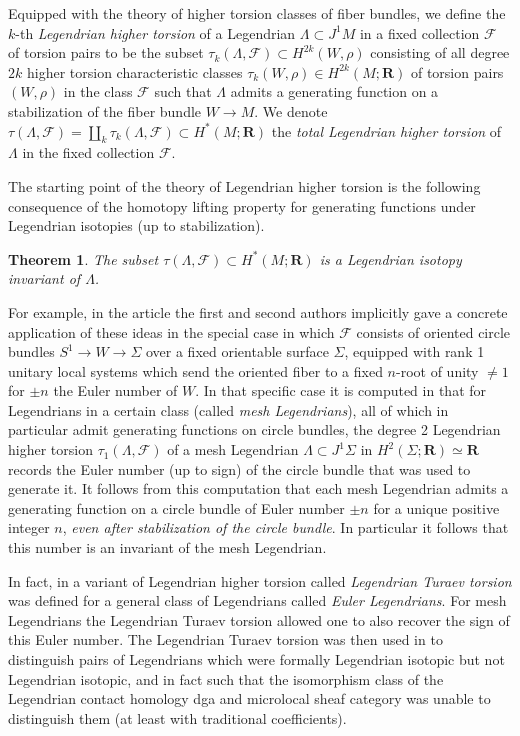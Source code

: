 \documentclass{amsart}
\newcommand\cF{\mathcal{F}}
\def\bR{\mathbf{R}}
\newtheorem{theorem}{Theorem}[section]
\theoremstyle{definition}
\theoremstyle{remark}
\newtheorem{inductive lemma}[theorem]{Inductive Lemma}
\begin{document}
Equipped with the theory of higher torsion classes of fiber bundles, we define the $k$-th {\em Legendrian higher torsion} of a Legendrian $\Lambda \subset J^1M$ in a fixed collection $\cF$ of torsion pairs to be the subset $\tau_k(\Lambda,\cF) \subset H^{2k}(W,\rho)$  consisting of all degree $2k$ higher torsion characteristic classes $\tau_k(W,\rho) \in H^{2k}(M;\bR)$ of torsion pairs $(W,\rho)$ in the class $\cF$ such that $\Lambda$ admits a generating function on a stabilization of the fiber bundle $W \to M$. We denote $\tau(\Lambda,\cF) = \coprod_k  \tau_k(\Lambda,\cF)  \subset H^*(M;\bR)$ the {\em total Legendrian higher torsion} of $\Lambda$ in the fixed collection $\cF$. 

The starting point of the theory of Legendrian higher torsion is the following consequence of the homotopy lifting property for generating functions under Legendrian isotopies (up to stabilization). %
 
 \begin{theorem} The subset $\tau(\Lambda,\cF) \subset H^*(M;\bR)$ is a Legendrian isotopy invariant of $\Lambda$. 
 \end{theorem}
 
For example, in the article \cite{AI} the first and second authors implicitly gave a concrete application of these ideas in the special case in which $\cF$ consists of oriented circle bundles $S^1 \to W \to \Sigma$ over a fixed orientable surface $\Sigma$, equipped with rank 1 unitary local systems which send the oriented fiber to a fixed $n$-root of unity $\neq 1$ for $\pm n$ the Euler number of $W$. In that specific case it is computed in \cite{AI} that for Legendrians in a certain class (called {\em mesh Legendrians}), all of which in particular admit generating functions on circle bundles, the degree 2 Legendrian higher torsion $\tau_1(\Lambda,\cF)$ of a mesh Legendrian $\Lambda \subset J^1 \Sigma$ in $H^2(\Sigma;\bR) \simeq \bR$ records the Euler number (up to sign)  of the circle bundle that was used to generate it. It follows from this computation that each mesh Legendrian admits a generating function on a circle bundle of Euler number $\pm n$ for a unique positive integer $n$, {\em even after stabilization of the circle bundle}. In particular it follows that this number is an invariant of the mesh Legendrian.

 In fact, in \cite{AI} a variant of Legendrian higher torsion called {\em Legendrian Turaev torsion} was defined for a general class of Legendrians called {\em Euler Legendrians}. For mesh Legendrians the Legendrian Turaev torsion allowed one to also recover the sign of this Euler number. The Legendrian Turaev torsion was then used in \cite{AI} to distinguish pairs of Legendrians which were formally Legendrian isotopic but not Legendrian isotopic, and in fact such that the isomorphism class of the Legendrian contact homology dga and microlocal sheaf category was unable to distinguish them (at least with traditional coefficients).  
 
\end{document}
